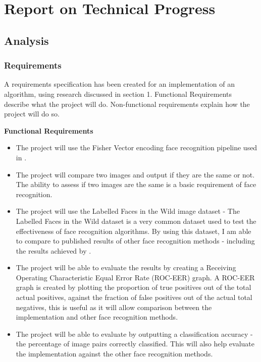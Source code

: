\documentclass[12pt, a4paper]{article}
\begin{document}
\newpage
\section{Report on Technical Progress}
\subsection{Analysis}
\subsubsection{Requirements}
A requirements specification has been created for an implementation of an algorithm, using research discussed in section 1. Functional Requirements describe what the project will do. Non-functional requirements explain how the project will do so.

\textbf{Functional Requirements}
\begin{itemize}
\item The project will use the Fisher Vector encoding face recognition pipeline used in \cite{simonyan2004fisher}.
\item The project will compare two images and output if they are the same or not. The ability to assess if two images are the same is a basic requirement of face recognition.
\item The project will use the Labelled Faces in the Wild image dataset - The Labelled Faces in the Wild dataset is a very common dataset used to test the effectiveness of face recognition algorithms. By using this dataset, I am able to compare to published results of other face recognition methods - including the results achieved by \cite{simonyan2004fisher}.
\item The project will be able to evaluate the results by creating a Receiving Operating Characteristic Equal Error Rate (ROC-EER) graph. A ROC-EER graph is created by plotting the proportion of true positives out of the total actual positives, against the fraction of false positives out of the actual total negatives, this is useful as it will allow comparison between the implementation and other face recognition methods.
\item The project will be able to evaluate by outputting a classification accuracy - the percentage of image pairs correctly classified. This will also help evaluate the implementation against the other face recognition methods.
\end{itemize}
\end{document}

